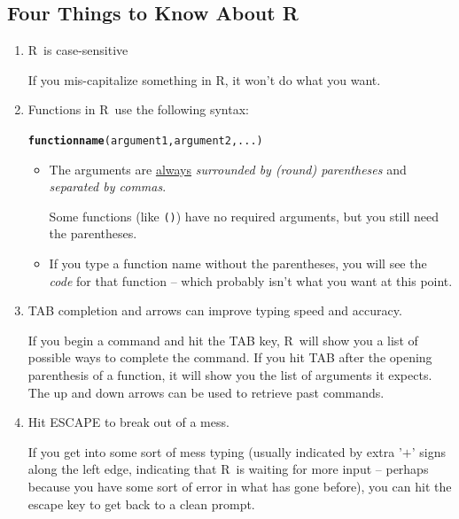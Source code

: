 \documentclass[twoside]{book}\usepackage[]{graphicx}\usepackage[]{xcolor}
\makeatletter
\newcommand{\hlstd}[1]{\textcolor[rgb]{0.345,0.345,0.345}{#1}}%
\newcommand{\hlkwd}[1]{\textcolor[rgb]{0.737,0.353,0.396}{\textbf{#1}}}%
\newenvironment{kframe}{%
 \def\at@end@of@kframe{}%
 \ifinner\ifhmode%
  \def\at@end@of@kframe{\end{minipage}}%
  \begin{minipage}{\columnwidth}%
 \fi\fi%
 \def\FrameCommand##1{\hskip\@totalleftmargin \hskip-\fboxsep
 \colorbox{shadecolor}{##1}\hskip-\fboxsep
     \hskip-\linewidth \hskip-\@totalleftmargin \hskip\columnwidth}%
 \MakeFramed {\advance\hsize-\width
   \@totalleftmargin\z@ \linewidth\hsize
   \@setminipage}}%
 {\par\unskip\endMakeFramed%
 \at@end@of@kframe}
\newenvironment{knitrout}{}{} %
\newcommand{\Rindex}[1]{\index{\texttt{#1}}}
\newcommand{\function}[1]{{\color{purple!75!blue}\texttt{\StrSubstitute{#1}{()}{}()}}\Rindex{#1}}
\def\R{{\sf R}}
\makeatother
\begin{document}
\subsection{Four Things to Know About \R}
\begin{enumerate}
\item \R\ is case-sensitive

If you mis-capitalize something in \R, it won't do what you want.

\item 
Functions in \R\ use the following syntax:
\begin{knitrout}
\color{fgcolor}\begin{kframe}
\begin{alltt}
\hlkwd{functionname}\hlstd{( argument1, argument2, ... )}
\end{alltt}
\end{kframe}
\end{knitrout}
\vspace{-5mm}
\begin{itemize}
\item The arguments are \underline{always} \emph{surrounded by (round) parentheses} and 
\emph{separated by commas}.

Some functions (like \function{data()}) 
have no required arguments, but you still need the parentheses.

\item
If you type a function name without the parentheses, you will see the \emph{code} for that
function -- which probably isn't what you want at this point.
\end{itemize}
\item
TAB completion and arrows can improve typing speed and accuracy.

If you begin a command and hit the TAB key, \R\ will show you a list of
possible ways to complete the command.  If you hit TAB after the opening
parenthesis of a function, it will show you the list of arguments it expects.
The up and down arrows can be used to retrieve past commands.
\item Hit ESCAPE to break out of a mess.
	
	If you get into some sort of mess typing (usually indicated by extra '$+$' 
	signs along the left edge, indicating that \R\ is waiting for more 
	input -- perhaps because you have some sort of error in what has gone before), 
	you can hit the escape key to get back to a clean prompt.
\end{enumerate}
\end{document}
